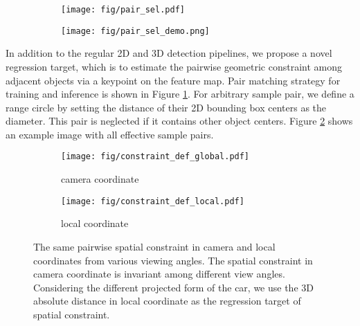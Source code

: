 \documentclass[10pt,twocolumn,letterpaper]{article}
\begin{document}
\label{sec:pair_select}
\begin{figure}
	\centering
	\begin{subfigure}{1.0\linewidth}
		\texttt{[image: fig/pair\_sel.pdf]}
		\caption{}
		\label{fig:pair_match}
	\end{subfigure}
	\begin{subfigure}{1.0\linewidth}
		\texttt{[image: fig/pair\_sel\_demo.png]}
		\caption{}
		\label{fig:pair_visual}
	\end{subfigure}
	\caption{
	}
	\label{fig:pair_demo}
\end{figure}

In addition to the regular 2D and 3D detection pipelines, we propose a novel regression target, which is to estimate the pairwise geometric constraint among adjacent objects via a keypoint on the feature map.
Pair matching strategy for training and inference is shown in Figure \ref{fig:pair_match}.
For arbitrary sample pair, we define a range circle by setting the distance of their 2D bounding box centers as the diameter. This pair is neglected if it contains other object centers. Figure \ref{fig:pair_visual} shows an example image with all effective sample pairs.


\begin{figure}[!t]
  \centering
  \begin{subfigure}{0.42\columnwidth}
		\texttt{[image: fig/constraint\_def\_global.pdf]}
		\caption{camera coordinate}
		\label{fig:cons_v_cam}
	\end{subfigure}
  \begin{subfigure}{0.435\columnwidth}
		\texttt{[image: fig/constraint\_def\_local.pdf]}
		\caption{local coordinate}
		\label{fig:cons_v_loc}
	\end{subfigure}
	\caption{
  The same pairwise spatial constraint in camera and local coordinates from various viewing angles. The spatial constraint in camera coordinate is invariant among different view angles. Considering the different projected form of the car, we use the 3D absolute distance in local coordinate as the regression target of spatial constraint.
  }
	\label{fig:constraint_global_vs_local}
\end{figure}
\end{document}
